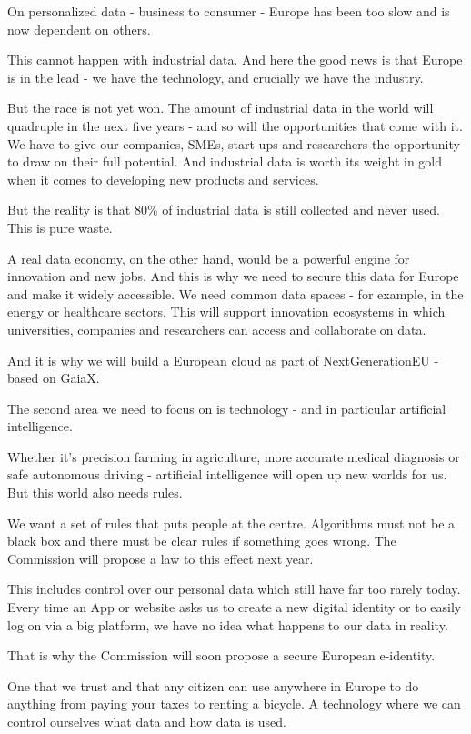 \documentclass[a4paper,11pt]{article}
\begin{document}
On personalized data - business to consumer -  Europe has been too slow and is now dependent on others.

This cannot happen with industrial data. And here the good news is that Europe is in the lead - we have the technology, and crucially we have the industry.

But the race is not yet won. The amount of industrial data in the world will quadruple in the next five years - and so will the opportunities that come with it.  We have to give our companies, SMEs, start-ups and researchers the opportunity to draw on their full potential. And industrial data is worth its weight in gold when it comes to developing new products and services.

But the reality is that 80\% of industrial data is still collected and never used. This is pure waste.

A real data economy, on the other hand, would be a powerful engine for innovation and new jobs.  And this is why we need to secure this data for Europe and make it widely accessible.  We need common data spaces - for example, in the energy or healthcare sectors. This will support innovation ecosystems in which universities, companies and researchers can access and collaborate on data.

And it is why we will build a European cloud as part of NextGenerationEU - based on GaiaX.

The second area we need to focus on is technology - and in particular artificial intelligence.

Whether it's precision farming in agriculture, more accurate medical diagnosis or safe autonomous driving - artificial intelligence will open up new worlds for us. But this world also needs rules.

We want a set of rules that puts people at the centre.  Algorithms must not be a black box and there must be clear rules if something goes wrong. The Commission will propose a law to this effect next year.

This includes control over our personal data which still have far too rarely today. Every time an App or website asks us to create a new digital identity or to easily log on via a big platform, we have no idea what happens to our data in reality.

That is why the Commission will soon propose a secure European e-identity. 

One that we trust and that any citizen can use anywhere in Europe to do anything from paying your taxes to renting a bicycle. A technology where we can control ourselves what data and how data is used.
\end{document}
